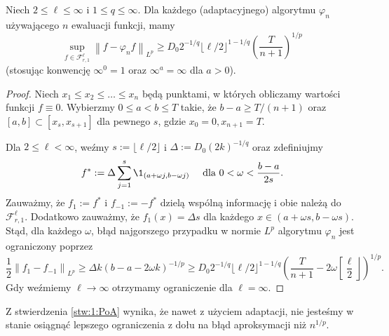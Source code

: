 \documentclass[oik, pdftex, man]{mgrwms}
\begin{document}
    \begin{stw} \label{stw:1:PoA}
        Niech $2 \leq \ell \leq \infty$ i $1 \leq q \leq \infty$. Dla każdego (adaptacyjnego) algorytmu $\varphi_{n}$ używającego $n$ ewaluacji funkcji, mamy
        \begin{equation*}
            \sup _{f \in \mathcal{F}_{r, 1}^{\ell}}\left\|f-\varphi_{n} f\right\|_{L^{p}} \geq D_{0} 2^{-1 / q}\lfloor\ell / 2\rfloor^{1-1 / q}\left(\frac{T}{n+1}\right)^{1 / p}    
        \end{equation*}
        (stosując konwencję $\infty^{0}=1$ oraz $\infty^{a}=\infty$ dla $a>0$).
    \end{stw}
    \begin{proof}
        Niech $x_{1} \leq x_{2} \leq \ldots \leq x_{n}$ będą punktami, w których obliczamy wartości funkcji $f \equiv 0$. Wybierzmy $0 \leq a<b \leq T$ takie, że $b-a \geq T /(n+1)$ oraz $[a, b] \subset\left[x_{s}, x_{s+1}\right]$ dla pewnego $s$, gdzie $x_{0}=0, x_{n+1}=T$.

        Dla $2 \leq \ell<\infty$, weźmy $s:=\lfloor\ell / 2\rfloor$ i $\Delta:=D_{0}(2 k)^{-1 / q}$ oraz zdefiniujmy
        \begin{equation*}
            f^{*}:=\Delta \sum_{j=1}^{s} \1_{(a+\omega j, b-\omega j)} \quad \text{ dla } 0<\omega<\frac{b-a}{2 s}.
        \end{equation*}
        Zauważmy, że $f_{1}:=f^{*}$ i $f_{-1}:=-f^{*}$ dzielą wspólną informację i obie należą do $\mathcal{F}_{r, 1}^{\ell}$. Dodatkowo zauważmy, że  $f_{1}(x)=\Delta s$ dla każdego $x \in(a+\omega s, b-\omega s)$. Stąd, dla każdego $\omega$, błąd najgorszego przypadku w normie $L^{p}$ algorytmu $\varphi_{n}$ jest ograniczony poprzez
        \begin{equation*}
            \frac{1}{2}\left\|f_{1}-f_{-1}\right\|_{L^{p}} \geq \Delta k(b-a-2 \omega k)^{-1 / p} \geq D_{0} 2^{-1 / q}\lfloor\ell / 2\rfloor^{1-1 / q}\left(\frac{T}{n+1}-2 \omega\left[\frac{\ell}{2}\right\rfloor\right)^{1 / p}.
        \end{equation*}
        Gdy weźmiemy $\ell \rightarrow \infty$ otrzymamy ograniczenie dla $\ell = \infty$.
    \end{proof}

    Z stwierdzenia \ref{stw:1:PoA} wynika, że nawet z użyciem adaptacji, nie jesteśmy w stanie osiągnąć lepszego ograniczenia z dołu na błąd aproksymacji niż $n^{1/p}$.
    
\end{document}
